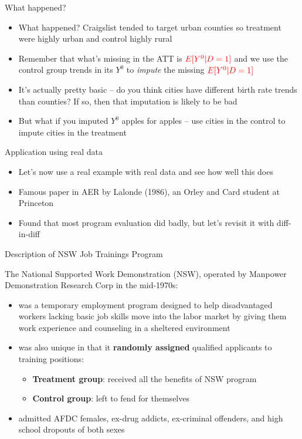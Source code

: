 \documentclass{beamer}
\begin{document}
\begin{frame}{What happened?}

\begin{itemize}
\item What happened?  Craigslist tended to target urban counties so treatment were highly urban and control highly rural
\item Remember that what's missing in the ATT is $\textcolor{red}{E[Y^0|D=1]}$ and we use the control group trends in its $Y^0$ to \emph{impute} the missing $\textcolor{red}{E[Y^0|D=1]}$
\item It's actually pretty basic -- do you think cities have different birth rate trends than counties?  If so, then that imputation is likely to be bad
\item But what if you imputed $Y^0$ apples for apples -- use cities in the control to impute cities in the treatment

\end{itemize}
\end{frame}




\begin{frame}{Application using real data}

\begin{itemize}
\item Let's now use a real example with real data and see how well this does
\item Famous paper in AER by Lalonde (1986), an Orley and Card student at Princeton
\item Found that most program evaluation did badly, but let's revisit it with diff-in-diff
\end{itemize}

\end{frame}

\begin{frame}{Description of NSW Job Trainings Program}
	
The National Supported Work Demonstration (NSW), operated by Manpower Demonstration Research Corp in the mid-1970s:
	\begin{itemize}
	\item was a temporary employment program designed to help disadvantaged workers lacking basic job skills move into the labor market by giving them work experience and counseling in a sheltered environment
	\item was also unique in that it \textbf{randomly assigned} qualified applicants to training positions:
		\begin{itemize}
		\item \textbf{Treatment group}: received all the benefits of NSW program
		\item \textbf{Control group}: left to fend for themselves
		\end{itemize}
	\item admitted AFDC females, ex-drug addicts, ex-criminal offenders, and high school dropouts of both sexes
	\end{itemize}
\end{frame}
\end{document}
